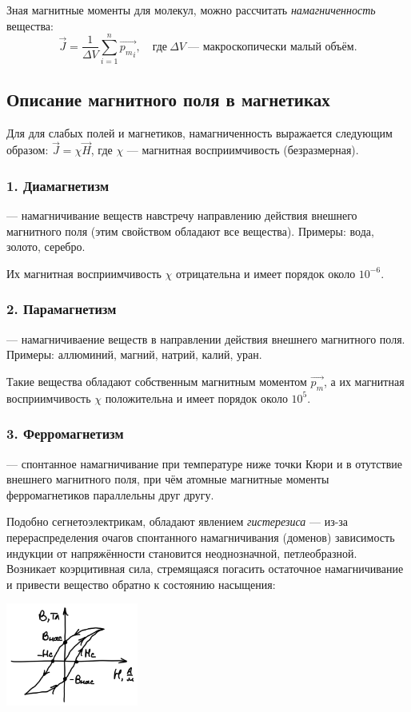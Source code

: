 \documentclass[12pt]{report}
\begin{document}
Зная магнитные моменты для молекул, можно рассчитать \textit{намагниченность} вещества:
\[\vec{J} = \frac{1}{\varDelta V} \sum_{i=1}^{n}\overrightarrow{{p_m}_i},
    \quad \textrm{где} \ \varDelta V \ \textrm{--- макроскопически малый объём.}\]
\subsection*{Описание магнитного поля в магнетиках}
Для для слабых полей и магнетиков, намагниченность выражается следующим образом:
$\vec{J} = \chi\vec{H}$, где $\chi$ --- магнитная восприимчивость (безразмерная).
\subsubsection*{1. Диамагнетизм}
--- намагничивание веществ навстречу направлению действия внешнего магнитного поля
(этим свойством обладают все вещества). Примеры: вода, золото, серебро.

Их магнитная восприимчивость $\chi$ отрицательна и имеет порядок около $10^{-6}$.
\subsubsection*{2. Парамагнетизм}
--- намагничиваение веществ в направлении действия внешнего магнитного поля. Примеры:
аллюминий, магний, натрий, калий, уран.

Такие вещества обладают собственным магнитным моментом $\vec{p_m}$,
а их магнитная восприимчивость $\chi$ положительна и имеет порядок около $10^5$.
\subsubsection*{3. Ферромагнетизм}
--- спонтанное намагничивание при температуре ниже точки Кюри и в отутствие внешнего
магнитного поля, при чём атомные магнитные моменты ферромагнетиков параллельны
друг другу.

Подобно сегнетоэлектрикам, обладают явлением \textit{гистерезиса} ---
из-за перераспределения очагов спонтанного намагничивания (доменов)
зависимость индукции от напряжённости становится неоднозначной, петлеобразной.
Возникает коэрцитивная сила, стремящаяся погасить остаточное намагничивание и
привести вещество обратно к состоянию насыщения:
\begin{center}
    \includegraphics[width=0.325\textwidth]{graphics/22_2.png}
\end{center}
\end{document}
